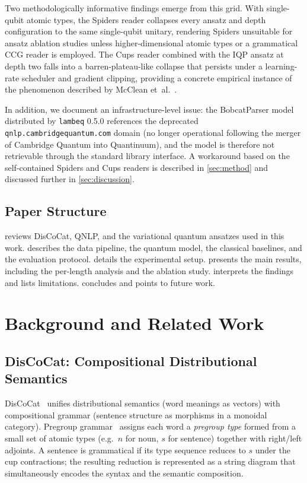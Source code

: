 \documentclass[runningheads]{llncs}
\begin{document}
Two methodologically informative findings emerge from this grid.
With single-qubit atomic types, the Spiders reader collapses every
ansatz and depth configuration to the same single-qubit unitary,
rendering Spiders unsuitable for ansatz ablation studies unless
higher-dimensional atomic types or a grammatical CCG reader is
employed. The Cups reader combined with the IQP ansatz at depth two
falls into a barren-plateau-like collapse that persists under a
learning-rate scheduler and gradient clipping, providing a concrete empirical
instance of the phenomenon described by McClean et~al.~\cite{mcclean2018}.

In addition, we document an infrastructure-level issue: the
BobcatParser model distributed by \texttt{lambeq} 0.5.0 references the
deprecated \texttt{qnlp.cambridgequantum.com} domain (no longer
operational following the merger of Cambridge Quantum into Quantinuum),
and the model is therefore not retrievable through the standard library
interface. A workaround based on the self-contained Spiders and Cups
readers is described in \cref{sec:method} and discussed further in
\cref{sec:discussion}.

\subsection{Paper Structure}

 reviews DisCoCat, QNLP, and the variational quantum
ansatzes used in this work.  describes the data pipeline,
the quantum model, the classical baselines, and the evaluation protocol.
 details the experimental setup. 
presents the main results, including the per-length analysis and the
ablation study.  interprets the findings and lists
limitations.  concludes and points to future work.

\section{Background and Related Work}\label{sec:background}

\subsection{DisCoCat: Compositional Distributional Semantics}

DisCoCat~\cite{coecke2010} unifies distributional semantics (word meanings as
vectors) with compositional grammar (sentence structure as morphisms in a
monoidal category). Pregroup grammar~\cite{lambek1958} assigns each word a
\emph{pregroup type} formed from a small set of atomic types (e.g.\ \(n\)
for noun, \(s\) for sentence) together with right/left adjoints. A sentence
is grammatical if its type sequence reduces to \(s\) under the cup
contractions; the resulting reduction is represented as a string diagram
that simultaneously encodes the syntax and the semantic composition.
\end{document}
